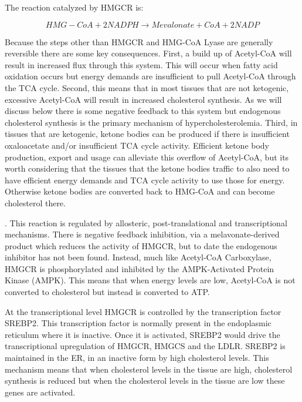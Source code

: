 \documentclass{tufte-handout}
\begin{document}
The reaction catalyzed by HMGCR is:

\begin{equation}\label{eq:hmgcs}
HMG-CoA + 2NADPH \rightarrow Mevalonate + CoA + 2NADP
\end{equation}

 Because the steps other than HMGCR and HMG-CoA Lyase are generally reversible there are some key consequences.  First, a build up of Acetyl-CoA will result in increased flux through this system.  This will occur when fatty acid oxidation occurs but energy demands are insufficient to pull Acetyl-CoA through the TCA cycle.  Second, this means that in most tissues that are not ketogenic, excessive Acetyl-CoA will result in increased cholesterol synthesis.  As we will discuss below there is some negative feedback to this system but endogenous cholesterol synthesis is the primary mechanism of hypercholesterolemia.  Third, in tissues that are ketogenic, ketone bodies can be produced if there is insufficient oxaloacetate and/or insufficient TCA cycle activity.  Efficient ketone body production, export and usage can alleviate this overflow of Acetyl-CoA, but its worth considering that the tissues that the ketone bodies traffic to also need to have efficient energy demands and TCA cycle activity to use those for energy.  Otherwise ketone bodies are converted back to HMG-CoA and can become cholesterol there.

.  This reaction is regulated by allosteric, post-translational and transcriptional mechanisms.  There is negative feedback inhibition, via a melavonate-derived product which reduces the activity of HMGCR, but to date the endogenous inhibitor has not been found.  Instead, much like Acetyl-CoA Carboxylase, HMGCR is phosphorylated and inhibited by the AMPK-Activated Protein Kinase (AMPK).  This means that when energy levels are low, Acetyl-CoA is not converted to cholesterol but instead is converted to ATP. 

  At the transcriptional level HMGCR is controlled by the transcription factor SREBP2.  This transcription factor is normally present in the endoplasmic reticulum where it is inactive.  Once it is activated, SREBP2 would drive the transcriptional upregulation of HMGCR, HMGCS and the LDLR.  SREBP2 is maintained in the ER, in an inactive form by high cholesterol levels.  This mechanism means that when cholesterol levels in the tissue are high, cholesterol synthesis is reduced but when the cholesterol levels in the tissue are low these genes are activated.
\end{document}
